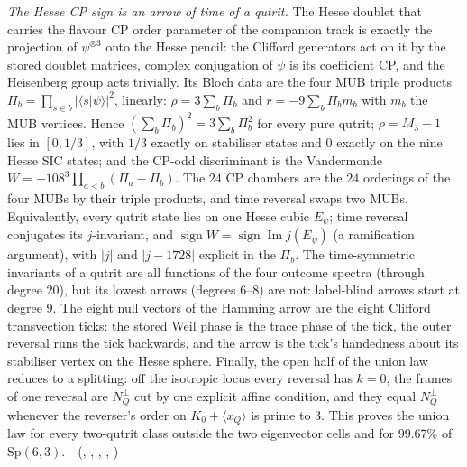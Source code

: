 \emph{The Hesse CP sign is an arrow of time of a qutrit.} The Hesse doublet that carries the flavour CP order parameter of the
companion track is exactly the projection of $\psi^{\otimes3}$ onto the Hesse pencil: the Clifford generators act on it by the stored
doublet matrices, complex conjugation of $\psi$ is its coefficient CP, and the Heisenberg group acts trivially. Its Bloch data are the
four MUB triple products $\Pi_b=\prod_{s\in b}|\langle s|\psi\rangle|^2$, linearly: $\rho=3\sum_b\Pi_b$ and $r=-9\sum_b\Pi_b m_b$ with
$m_b$ the MUB vertices. Hence $(\sum_b\Pi_b)^2=3\sum_b\Pi_b^2$ for every pure qutrit; $\rho=M_3-1$ lies in $[0,1/3]$, with $1/3$ exactly
on stabiliser states and $0$ exactly on the nine Hesse SIC states; and the CP-odd discriminant is the Vandermonde
$W=-108^3\prod_{a<b}(\Pi_a-\Pi_b)$. The $24$ CP chambers are the $24$ orderings of the four MUBs by their triple products, and time
reversal swaps two MUBs. Equivalently, every qutrit state lies on one Hesse cubic $E_\psi$; time reversal conjugates its $j$-invariant,
and $\operatorname{sign}W=\operatorname{sign}\operatorname{Im}j(E_\psi)$ (a ramification argument), with $|j|$ and $|j-1728|$ explicit in
the $\Pi_b$. The time-symmetric invariants of a qutrit are all functions of the four outcome spectra (through degree $20$), but its
lowest arrows (degrees $6$--$8$) are not: label-blind arrows start at degree $9$. The eight null vectors of the Hamming arrow are the
eight Clifford transvection ticks: the stored Weil phase is the trace phase of the tick, the outer reversal runs the tick backwards, and
the arrow is the tick's handedness about its stabiliser vertex on the Hesse sphere. Finally, the open half of the union law reduces to a
splitting: off the isotropic locus every reversal has $k=0$, the frames of one reversal are $N_Q^\perp$ cut by one explicit affine
condition, and they equal $N_Q^\perp$ whenever the reverser's order on $K_0+\langle x_Q\rangle$ is prime to $3$. This proves the union law
for every two-qutrit class outside the two eigenvector cells and for $99.67\%$ of $\mathrm{Sp}(6,3)$.
\tierT\,\tierC\ (, ,
, ,
)

